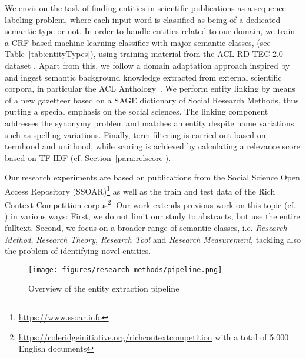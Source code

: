 We envision the task of finding entities in scientific publications as a sequence labeling problem, 
where each input word is classified as being of a dedicated semantic type or not.
In order to handle entities related to our domain, we train a CRF based machine learning classifier with major semantic classes,
(see Table~\ref{tab:entityTypes}), 
using training material from the ACL RD-TEC 2.0 dataset \cite{qasemizadeh2016acl}.
Apart from this, we follow a domain adaptation approach inspired by \cite{agerri2016robust} and ingest semantic background knowledge extracted from external scientific corpora, in particular the ACL Anthology~\cite{bird2008acl,gildea2018acl}.
We perform entity linking by means of a new gazetteer based on a SAGE dictionary of Social Research Methods\cite{lewis2003sage}, thus putting a special emphasis on the social sciences. 
The linking component addresses the synonymy problem and matches an entity despite name variations such as spelling variations. 
Finally, term filtering is carried out based on termhood and unithood, while scoring is achieved by calculating a relevance score based on TF-IDF (cf. Section~\ref{para:relscore}).

Our research experiments are based on publications from the Social Science Open Access Repository (SSOAR)\footnote{\url{https://www.ssoar.info}} as well as the train and test data of the Rich Context Competition corpus\footnote{\url{https://coleridgeinitiative.org/richcontextcompetition}
with a total of 5,000 English documents}.
Our work extends previous work on this topic (cf. \cite{eckle2013automatically}) in various ways: First, we do not limit our study to abstracts, but use the entire fulltext. Second, we focus on a broader range of semantic classes, 
i.e. \textit{Research Method}, \textit{Research Theory}, \textit{Research Tool} and \textit{Research Measurement}, tackling also the problem of identifying novel entities.
 


\begin{figure}[t]
\centering
    \texttt{[image: figures/research-methods/pipeline.png]}
    \caption{Overview of the entity extraction pipeline}
\label{fig:pipeline}
\end{figure}



